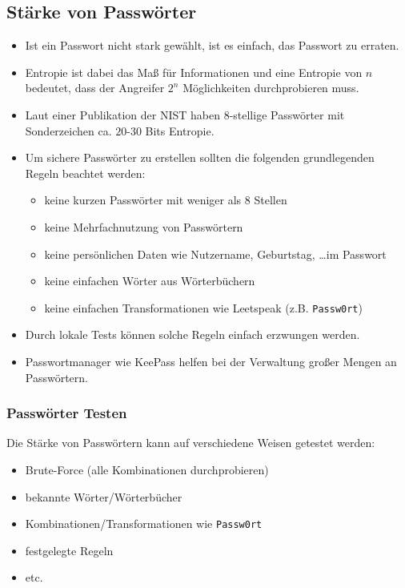 \documentclass[a4paper, 11pt, accentcolor = tud3b]{tudreport}
\begin{document}
            \subsection{Stärke von Passwörter}
                \begin{itemize}
                	\item Ist ein Passwort nicht stark gewählt, ist es einfach, das Passwort zu erraten.
                	\item Entropie ist dabei das Maß für Informationen und eine Entropie von \(n\) bedeutet, dass der Angreifer \(2^n\) Möglichkeiten durchprobieren muss.
                	\item Laut einer Publikation der NIST haben 8-stellige Passwörter mit Sonderzeichen ca. \(20\)-\(30\) Bits Entropie.
                	\item Um sichere Passwörter zu erstellen sollten die folgenden grundlegenden Regeln beachtet werden:
	                	\begin{itemize}
	                		\item keine kurzen Passwörter mit weniger als 8 Stellen
	                		\item keine Mehrfachnutzung von Passwörtern
	                		\item keine persönlichen Daten wie Nutzername, Geburtstag, \dots im Passwort
	                		\item keine einfachen Wörter aus Wörterbüchern
	                		\item keine einfachen Transformationen wie Leetspeak (z.B. \texttt{Passw0rt})
	                	\end{itemize}
                	\item Durch lokale Tests können solche Regeln einfach erzwungen werden.
                	\item Passwortmanager wie KeePass helfen bei der Verwaltung großer Mengen an Passwörtern.
                \end{itemize}

                \subsubsection{Passwörter Testen}
	                Die Stärke von Passwörtern kann auf verschiedene Weisen getestet werden:
                    \begin{itemize}
                    	\item Brute-Force (alle Kombinationen durchprobieren)
                    	\item bekannte Wörter/Wörterbücher
                    	\item Kombinationen/Transformationen wie \texttt{Passw0rt}
                    	\item festgelegte Regeln
                    	\item etc.
                    \end{itemize}
\end{document}
